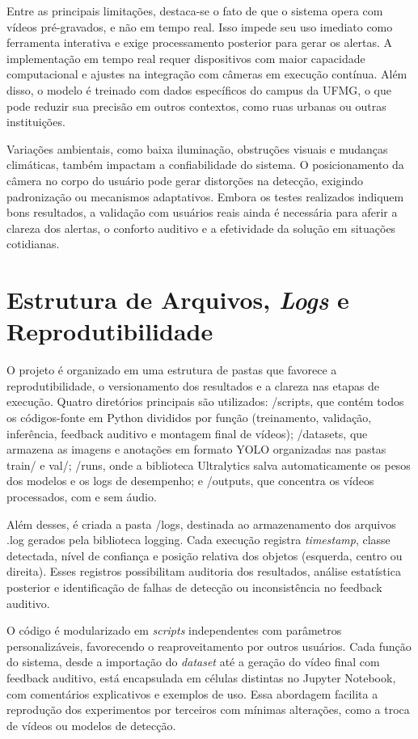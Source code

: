 Entre as principais limitações, destaca-se o fato de que o sistema opera com vídeos pré-gravados, e não em tempo real. Isso impede seu uso imediato como ferramenta interativa e exige processamento posterior para gerar os alertas. A implementação em tempo real requer dispositivos com maior capacidade computacional e ajustes na integração com câmeras em execução contínua. Além disso, o modelo é treinado com dados específicos do campus da UFMG, o que pode reduzir sua precisão em outros contextos, como ruas urbanas ou outras instituições.

Variações ambientais, como baixa iluminação, obstruções visuais e mudanças climáticas, também impactam a confiabilidade do sistema. O posicionamento da câmera no corpo do usuário pode gerar distorções na detecção, exigindo padronização ou mecanismos adaptativos. Embora os testes realizados indiquem bons resultados, a validação com usuários reais ainda é necessária para aferir a clareza dos alertas, o conforto auditivo e a efetividade da solução em situações cotidianas.

\section{Estrutura de Arquivos, \textit{Logs} e Reprodutibilidade}

O projeto é organizado em uma estrutura de pastas que favorece a reprodutibilidade, o versionamento dos resultados e a clareza nas etapas de execução. Quatro diretórios principais são utilizados: /scripts, que contém todos os códigos-fonte em Python divididos por função (treinamento, validação, inferência, feedback auditivo e montagem final de vídeos); /datasets, que armazena as imagens e anotações em formato YOLO organizadas nas pastas train/ e val/; /runs, onde a biblioteca Ultralytics salva automaticamente os pesos dos modelos e os logs de desempenho; e /outputs, que concentra os vídeos processados, com e sem áudio.

Além desses, é criada a pasta /logs, destinada ao armazenamento dos arquivos .log gerados pela biblioteca logging. Cada execução registra \textit{timestamp}, classe detectada, nível de confiança e posição relativa dos objetos (esquerda, centro ou direita). Esses registros possibilitam auditoria dos resultados, análise estatística posterior e identificação de falhas de detecção ou inconsistência no feedback auditivo.

O código é modularizado em \textit{scripts} independentes com parâmetros personalizáveis, favorecendo o reaproveitamento por outros usuários. Cada função do sistema, desde a importação do \textit{dataset} até a geração do vídeo final com feedback auditivo, está encapsulada em células distintas no Jupyter Notebook, com comentários explicativos e exemplos de uso. Essa abordagem facilita a reprodução dos experimentos por terceiros com mínimas alterações, como a troca de vídeos ou modelos de detecção.

